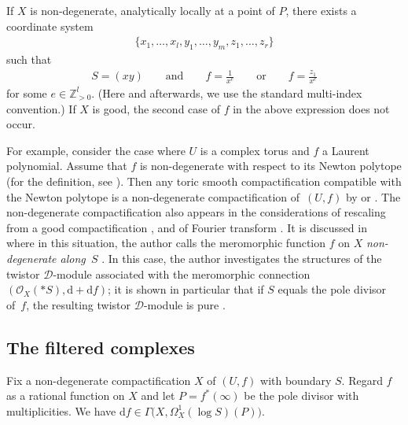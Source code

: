 \documentclass[11pt]{article}
\newcommand{\ZZ}{\mathbb{Z}}
\newcommand{\sD}{\mathscr{D}}
\newcommand{\sO}{\mathscr{O}}
\newcommand{\de}{\mathrm{d}}
\newcommand{\cpt}{compactification}
\begin{document}
If $X$ is non-degenerate, analytically locally at a point of $P$, there exists a coordinate system
\begin{gather*} \{x_1,\dots,x_l, y_1,\dots,y_m,z_1,\dots,z_r\} \end{gather*}
such that
\begin{gather}\label{eq:non-deg-local}
S = (xy) \qquad\text{and}\qquad f= \frac{1}{x^e} \qquad\text{or}\qquad f = \frac{z_1}{x^e}
\end{gather}
for some $e \in \ZZ_{>0}^l$. (Here and afterwards, we use the standard multi-index convention.) If $X$ is good, the second case of $f$ in the above expression does not occur.

For example, consider the case where $U$ is a complex torus and $f$ a Laurent polynomial. Assume that $f$ is non-degenerate with respect to its Newton polytope (for the definition, see \cite[Section~4]{Y}). Then any toric smooth {\cpt} compatible with the Newton polytope is a non-degenerate {\cpt} of~$(U,f)$ by \cite[Proposition~4.3]{Y} or \cite[Lemma~6.6]{M_GKZ}. The non-degenerate {\cpt} also appears in the considerations of rescaling
from a good {\cpt} \cite[Section~7.3]{SY}, and of Fourier transform \cite[Section~4]{S}. It is discussed in~\cite{M_GKZ} where in this situation, the author calls the meromorphic function $f$ on $X$ \textit{non-degenerate along~$S$} \cite[Definition~2.6]{M_GKZ}. In this case, the author investigates the structures of the twistor $\sD$-module associated with the meromorphic connection $(\sO_X(*S), \de +\de f)$; it is shown in particular that if $S$ equals the pole divisor of~$f$, the resulting twistor $\sD$-module is pure \cite[Lemma~2.10 and Corollary~3.12]{M_GKZ}.

\subsection{The filtered complexes}
Fix a non-degenerate {\cpt} $X$ of $(U,f)$ with boundary $S$. Regard $f$ as a rational function on $X$ and let $P = f^*(\infty)$ be the pole divisor with multiplicities. We have $\de f \in \Gamma\big(X,\Omega_X^1(\log S)(P)\big)$.
\end{document}
